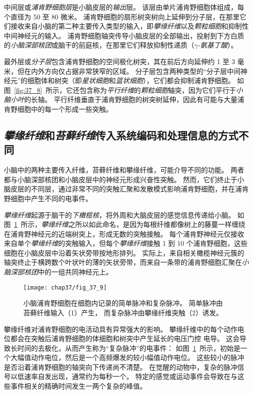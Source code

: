 中间层或\textit{浦肯野细胞层}是小脑皮层的\textit{输出}层。
该层由单片浦肯野细胞体组成，每个直径为 50 至 80 微米。
浦肯野细胞的扇形树突树向上延伸到分子层，在那里它们接收来自小脑的第二种主要传入类型的输入，即\textit{攀缘纤维}以及\textit{颗粒细胞}和抑制性中间神经元的输入。
浦肯野细胞轴突传导小脑皮层的全部输出，投射到下方白质的\textit{小脑深部核团}或脑干的前庭核，在那里它们释放抑制性递质（\textit{$\gamma$-氨基丁酸}）。


最外层或\textit{分子层}包含浦肯野细胞的空间极化树突，其在前后方向延伸约 1 至 3 毫米，但在内外方向仅占据非常狭窄的区域。
分子层包含两种类型的“分子层中间神经元”的细胞体和树突（即\textit{星状细胞}和\textit{篮状细胞}），它们都会抑制浦肯野细胞。
如图~\ref{fig:37_8}~所示，它还包含称为\textit{平行纤维}的\textit{颗粒细胞}轴突，因为它们平行于\textit{小脑小叶}的长轴。
平行纤维垂直于浦肯野细胞的树突树延伸，因此有可能与大量浦肯野细胞中的每一个形成一些突触。


\subsection{\textit{攀缘纤维}和\textit{苔藓纤维}传入系统编码和处理信息的方式不同}

小脑中的两种主要传入纤维，苔藓纤维和攀缘纤维，可能介导不同的功能。
两者都与小脑深部核团和小脑皮层中的神经元形成兴奋性突触。
然而，它们终止于小脑皮层的不同层，通过非常不同的突触汇聚和发散模式影响浦肯野细胞，并在浦肯野细胞中产生不同的电事件。


\textit{攀缘纤维}起源于脑干的\textit{下橄榄核}，将外周和大脑皮层的感觉信息传递给小脑。
如图~\ref{fig:37_9}~所示，\textit{攀缘纤维}之所以如此命名，是因为每根纤维都像树上的藤蔓一样缠绕在浦肯野神经元的近端树突上，形成无数的突触接触。
每个浦肯野神经元仅接收来自单个\textit{攀缘纤维}的突触输入，但每个\textit{攀缘纤维}接触 1 到 10 个浦肯野细胞，这些细胞在小脑皮层中沿着矢状旁带按地形排列。
实际上，来自相关橄榄神经元簇的轴突终止于横跨数个叶状叶的薄的矢状旁带，而来自一条带的浦肯野细胞汇聚在\textit{小脑深部核团}中的一组共同神经元上。


\begin{figure}[htbp]
	\centering
	\texttt{[image: chap37/fig\_37\_9]}
	\caption{小脑浦肯野细胞在细胞内记录的简单脉冲和复杂脉冲。
		简单脉冲由苔藓纤维输入（1）产生，
		而复杂脉冲由攀缘纤维突触（2）诱发\cite{martinez1971electrogenesis}。}
	\label{fig:37_9}
\end{figure}


攀缘纤维对浦肯野细胞的电活动具有异常强大的影响。
攀缘纤维中的每个动作电位都会在突触后浦肯野细胞的体细胞和树突中产生延长的电压门控  电导。
这会导致长时间的去极化，从而产生称为“复杂脉冲”的电事件：
如图~\ref{fig:37_9}~所示，初始是一个大幅值动作电位，然后是一个高频爆发的较小幅值动作电位。
这些较小的脉冲是否沿着浦肯野细胞的轴突向下传递尚不清楚。
在觉醒的动物中，复杂的脉冲信号以低速率自发出现，通常约为每秒一个。
特定的感觉或运动事件会导致在与这些事件相关的精确时间发生一两个复杂的峰值。


